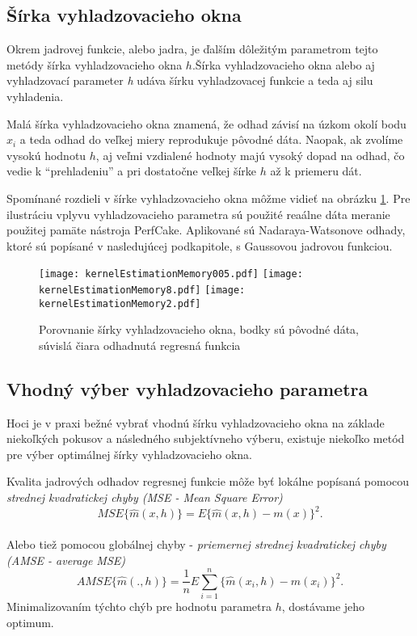 \subsection{Šírka vyhladzovacieho okna}

Okrem jadrovej funkcie, alebo jadra, je ďalším dôležitým parametrom tejto metódy šírka vyhladzovacieho okna $h$.Šírka vyhladzovacieho okna alebo aj vyhladzovací parameter \textit{h} udáva šírku vyhladzovacej funkcie a teda aj silu vyhladenia. 

Malá šírka vyhladzovacieho okna znamená, že odhad závisí na úzkom okolí bodu $x_i$ a teda odhad do veľkej miery reprodukuje pôvodné dáta. Naopak, ak zvolíme vysokú hodnotu $h$, aj veľmi vzdialené hodnoty majú vysoký dopad na odhad, čo vedie k ``prehladeniu'' a pri dostatočne veľkej šírke $h$ až k priemeru dát.

 Spomínané rozdieli v šírke vyhladzovacieho okna môžme vidieť na obrázku \ref{porovnanieSirky}. Pre ilustráciu vplyvu vyhladzovacieho parametra sú použité reaálne dáta meranie použitej pamäte nástroja PerfCake. Aplikované sú Nadaraya-Watsonove odhady, ktoré sú popísané v nasledujúcej podkapitole, s Gaussovou jadrovou funkciou. 
 
 \begin{figure}[!ht]
  \texttt{[image: kernelEstimationMemory005.pdf]}
  \texttt{[image: kernelEstimationMemory8.pdf]}
  \centering
  \texttt{[image: kernelEstimationMemory2.pdf]}
  \caption{Porovnanie šírky vyhladzovacieho okna, bodky sú pôvodné dáta, súvislá čiara odhadnutá regresná funkcia}\label{porovnanieSirky}
\end{figure}

\subsection{Vhodný výber vyhladzovacieho parametra}
Hoci je v praxi bežné vybrať vhodnú šírku vyhladzovacieho okna na základe niekoľkých pokusov a následného subjektívneho výberu, existuje niekoľko metód pre výber optimálnej šírky vyhladzovacieho okna.

Kvalita jadrových odhadov regresnej funkcie môže byť lokálne popísaná pomocou \textit{strednej kvadratickej chyby (MSE - Mean Square Error)}
\begin{equation*}
MSE\{\hat{m}(x,h)\} = E{\{\hat{m}(x,h) - m(x)\}}^2.
\end{equation*} 
\\
Alebo tiež pomocou globálnej chyby - \textit{priemernej strednej kvadratickej chyby (AMSE - average MSE)}
\begin{equation*}
AMSE\{\hat{m}(.,h)\} = \frac{1}{n}E\sum\limits_{i=1}^{n} {\{\hat{m}(x_i,h) - m(x_i)\}}^2.
\end{equation*}
Minimalizovaním týchto chýb pre hodnotu parametra $h$, dostávame jeho optimum.

